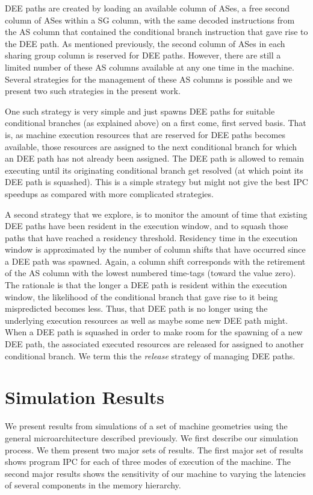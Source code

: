 \documentclass[10pt,dvips]{article}
\begin{document}
DEE paths are created by loading an available
column of ASes, a free second column of ASes within a SG column, with
the same decoded instructions from the AS column that contained
the conditional branch instruction that gave rise to the DEE path.
As mentioned previously, the second column of ASes in each sharing
group column is reserved for DEE paths.
However, there are still a limited number of these AS columns
available at any one time in the machine.
Several strategies for the management of these AS columns is
possible and we present two such strategies in the present work.

One such strategy is very simple and just 
spawns DEE paths for suitable conditional
branches (as explained above) on a first come, first served basis.  
That is, as machine
execution resources that are reserved for DEE paths
becomes available, those resources are assigned to the next conditional
branch for which an DEE path has not already 
been assigned.  The DEE path is allowed to
remain executing until its originating conditional
branch get resolved (at which point its DEE
path is squashed).
This is a simple strategy but might
not give the best IPC speedups as compared with more complicated
strategies.  

A second strategy that we explore, is to monitor
the amount of time that existing DEE paths have been
resident in the execution window, and to squash those paths that
have reached a residency threshold.  Residency time in the
execution window is approximated by the number of column shifts that
have occurred since a DEE path was spawned.  
Again, a column
shift corresponds with the retirement of the AS column with the
lowest numbered time-tags (toward the value zero).
The rationale is that the longer a DEE path is resident
within the execution window,
the likelihood of the conditional branch that gave rise to it being 
mispredicted becomes less.  
Thus, that DEE path is no longer using the
underlying execution resources as well as maybe some new DEE
path might.
When a DEE path is 
squashed in order to make room for
the spawning of a new DEE path, the associated
executed resources are released for assigned to another conditional
branch.
We term this the \textit{release} strategy of managing
DEE paths.
%
%
\section{Simulation Results}
%
We present results from simulations of a set of machine geometries
using the general microarchitecture described previously.
We first describe our simulation process.
We them present two major sets of results.
The first major set of results shows program IPC for each of three
modes of execution of the machine.
The second major results shows the sensitivity of our machine
to varying the latencies of several components in the memory hierarchy.
%
\end{document}
